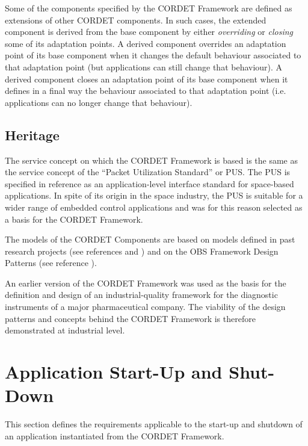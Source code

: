 \documentclass[a4paper,10pt]{article}
\let\stdsection\section
\renewcommand\section{\newpage\stdsection}
\begin{document}
Some of the components specified by the CORDET Framework are defined as extensions of other CORDET components. 
In such cases, the extended component is derived from the base component by either \textit{overriding} or \textit{closing} some of its adaptation points. 
A derived component overrides an adaptation point of its base component when it changes the default behaviour associated to that adaptation point (but applications can still change that behaviour). 
A derived component closes an adaptation point of its base component when it defines in a final way the behaviour associated to that adaptation point (i.e. applications can no longer change that behaviour).

\subsection{Heritage}\label{sec:Heritage}
The service concept on which the CORDET Framework is based is the same as the service concept of the “Packet Utilization Standard” or PUS. 
The PUS is specified in reference \cite{ref:pus} as an application-level interface standard for space-based applications. 
In spite of its origin in the space industry, the PUS is suitable for a wider range of embedded control applications and was for this reason selected as a basis for the CORDET Framework. 

The models of the CORDET Components are based on models defined in past research projects (see references \cite{ref:assert} and \cite{ref:cordet}) and on the OBS Framework Design Patterns (see reference \cite{ref:obs}). 

An earlier version of the CORDET Framework was used as the basis for the definition and design of an industrial-quality framework for the diagnostic instruments of a major pharmaceutical company. The viability of the design patterns and concepts behind the CORDET Framework is therefore demonstrated at industrial level. 

\section{Application Start-Up and Shut-Down}\label{sec:AppStartUpAndShutdown}

This section defines the requirements applicable to the start-up and shutdown of an application instantiated from the CORDET Framework.
\end{document}
